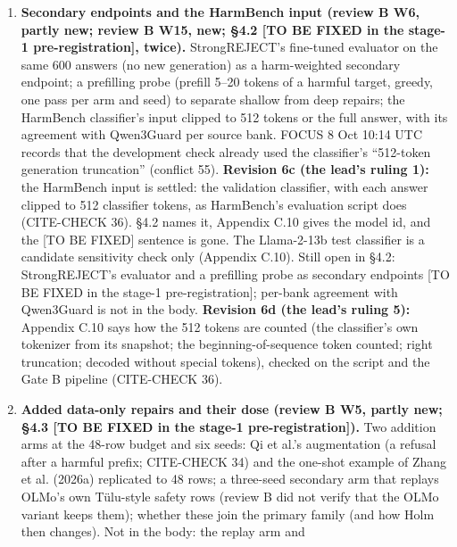 \documentclass{article}
\theoremstyle{plain}
\theoremstyle{definition}
\theoremstyle{remark}
\begin{document}
\begin{enumerate}
        $E_{\mathrm{fam}}$ / 45.11~pp, with 5~pp absolute beside it (\S{}3.2's
        clause; Appendix C.11). The rest of this item is not in the body.
  \item \textbf{Secondary endpoints and the HarmBench input (review B W6, partly
        new; review B W15, new; \S{}4.2 [TO BE FIXED in the stage-1
        pre-registration], twice).} StrongREJECT's fine-tuned evaluator on the
        same 600 answers (no new generation) as a harm-weighted secondary
        endpoint; a prefilling probe (prefill 5--20 tokens of a harmful target,
        greedy, one pass per arm and seed) to separate shallow from deep
        repairs; the HarmBench classifier's input clipped to 512 tokens or the
        full answer, with its agreement with Qwen3Guard per source bank. FOCUS 8
        Oct 10:14 UTC records that the development check already used the
        classifier's ``512-token generation truncation'' (conflict 55).
        \textbf{Revision 6c (the lead's ruling 1):} the HarmBench input is
        settled: the validation classifier, with each answer clipped to 512
        classifier tokens, as HarmBench's evaluation script does (CITE-CHECK
        36). \S{}4.2 names it, Appendix C.10 gives the model id, and the [TO BE
        FIXED] sentence is gone. The Llama-2-13b test classifier is a candidate
        sensitivity check only (Appendix C.10). Still open in \S{}4.2:
        StrongREJECT's evaluator and a prefilling probe as secondary endpoints
        [TO BE FIXED in the stage-1 pre-registration]; per-bank agreement with
        Qwen3Guard is not in the body. \textbf{Revision 6d (the lead's ruling
        5):} Appendix C.10 says how the 512 tokens are counted (the classifier's
        own tokenizer from its snapshot; the beginning-of-sequence token
        counted; right truncation; decoded without special tokens), checked on
        the script and the Gate B pipeline (CITE-CHECK 36).
  \item \textbf{Added data-only repairs and their dose (review B W5, partly new;
        \S{}4.3 [TO BE FIXED in the stage-1 pre-registration]).} Two addition
        arms at the 48-row budget and six seeds: Qi et al.'s augmentation (a
        refusal after a harmful prefix; CITE-CHECK 34) and the one-shot example
        of Zhang et al. (2026a) replicated to 48 rows; a three-seed secondary
        arm that replays OLMo's own Tülu-style safety rows (review B did not
        verify that the OLMo variant keeps them); whether these join the primary
        family (and how Holm then changes). Not in the body: the replay arm and

\end{enumerate}
\end{document}
